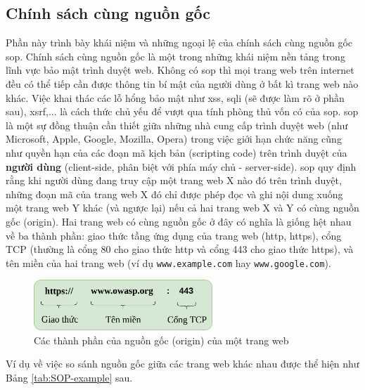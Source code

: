 \subsection{Chính sách cùng nguồn gốc}
Phần này trình bày khái niệm và những ngoại lệ của chính sách cùng nguồn gốc \parencite{sullivan2011web} \acrfull{sop}. Chính sách cùng nguồn gốc là một trong những khái niệm nền tảng trong lĩnh vực bảo mật trình duyệt web. Không có \acrshort{sop} thì mọi trang web trên internet đều có thể tiếp cần được thông tin bí mật của người dùng ở bất kì trang web nào khác. Việc khai thác các lỗ hổng bảo mật như \acrshort{xss}, \acrshort{sqli} (sẽ được làm rõ ở phần sau), \acrfull{xsrf},... là cách thức chủ yếu để vượt qua tính phòng thủ vốn có của \acrshort{sop}. \acrshort{sop} là một sự đồng thuận cần thiết giữa những nhà cung cấp trình duyệt web (như Microsoft, Apple, Google, Mozilla, Opera) trong việc giới hạn chức năng cũng như quyền hạn của các đoạn mã kịch bản (scripting code) trên trình duyệt của \textbf{người dùng} (client-side, phân biệt với phía máy chủ - server-side). \acrshort{sop} quy định rằng khi người dùng đang truy cập một trang web X nào đó trên trình duyệt, những đoạn mã của trang web X đó chỉ được phép đọc và ghi nội dung xuống một trang web Y khác (và ngược lại) nếu cả hai trang web X và Y có cùng nguồn gốc (origin). Hai trang web có cùng nguồn gốc ở đây có nghĩa là giống hệt nhau về ba thành phần: giao thức tầng ứng dụng của trang web (\acrshort{http}, \acrshort{https}), cổng TCP (thường là cổng 80 cho giao thức \acrshort{http} và cổng 443 cho giao thức \acrshort{https}), và tên miền của hai trang web (ví dụ \texttt{www.example.com} hay \texttt{www.google.com}).
\begin{figure}[H]
  \centering
    \includegraphics[width=0.6\textwidth,keepaspectratio=true]{images/origin-definition.png}
  \caption{Các thành phần của nguồn gốc (origin) của một trang web}
  \label{fig:origin-definition}
\end{figure}
Ví dụ về việc so sánh nguồn gốc giữa các trang web khác nhau được thể hiện như Bảng \ref{tab:SOP-example} sau.
